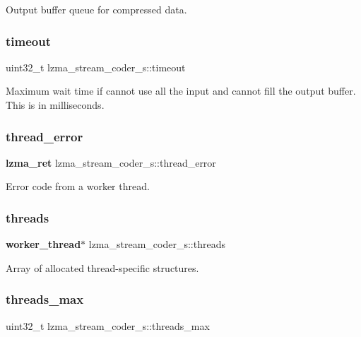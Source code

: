 Output buffer queue for compressed data. 

\mbox{\label{structlzma__stream__coder__s_aead7c40074a6cffc4ceb382a203cee80}} 
\subsubsection{timeout}
{\footnotesize\ttfamily uint32\+\_\+t lzma\+\_\+stream\+\_\+coder\+\_\+s\+::timeout}

Maximum wait time if cannot use all the input and cannot fill the output buffer. This is in milliseconds. \mbox{\label{structlzma__stream__coder__s_ad000e335a0e4a3918bc05f4d5cbff4f6}} 
\subsubsection{thread\+\_\+error}
{\footnotesize\ttfamily \textbf{ lzma\+\_\+ret} lzma\+\_\+stream\+\_\+coder\+\_\+s\+::thread\+\_\+error}



Error code from a worker thread. 

\mbox{\label{structlzma__stream__coder__s_ae69c31887d32900dfaaa62c33407bc15}} 
\subsubsection{threads}
{\footnotesize\ttfamily \textbf{ worker\+\_\+thread}$\ast$ lzma\+\_\+stream\+\_\+coder\+\_\+s\+::threads}



Array of allocated thread-\/specific structures. 

\mbox{\label{structlzma__stream__coder__s_af1a1a27b2bbced747ecc06b07f3cd3ea}} 
\subsubsection{threads\+\_\+max}
{\footnotesize\ttfamily uint32\+\_\+t lzma\+\_\+stream\+\_\+coder\+\_\+s\+::threads\+\_\+max}


